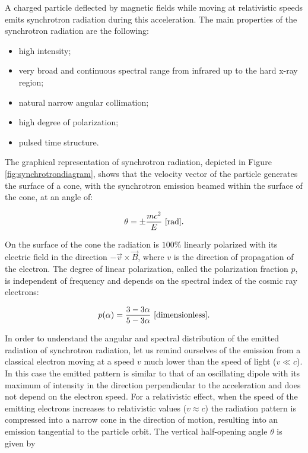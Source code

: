 \documentclass[a4paper,10pt]{article}
\begin{document}
{\noindent}A charged particle deflected by magnetic fields while moving at relativistic speeds emits synchrotron radiation during this acceleration. The main properties of the synchrotron radiation are the following:

\begin{itemize}
    \item high intensity;
    \item very broad and continuous spectral range from infrared up to the hard x-ray region;
    \item natural narrow angular collimation;
    \item high degree of polarization;
    \item pulsed time structure.
\end{itemize}

The graphical representation of synchrotron radiation, depicted in Figure \ref{fig:synchrotrondiagram}, shows that the velocity vector of the particle generates the surface of a cone, with the synchrotron emission beamed within the surface of the cone, at an angle of:

\begin{align*}
    \theta = \pm \frac{mc^2}{E} ~ [{\rm rad}].
\end{align*}

{\noindent}On the surface of the cone the radiation is $100\%$ linearly polarized with its electric field in the direction $-\vec{v}\times\vec{B}$, where $v$ is the direction of propagation of the electron. The degree of linear polarization, called the polarization fraction $p$, is independent of frequency and depends on the spectral index of the cosmic ray electrons:

\begin{align*}
    p(\alpha) = \frac{3-3\alpha}{5-3\alpha} ~ [{\rm dimensionless}].
\end{align*}

{\noindent}In order to understand the angular and spectral distribution of the emitted radiation of synchrotron radiation, let us remind ourselves of the emission from a classical electron moving at a speed $v$ much lower than the speed of light ($v\ll c$). In this case the emitted pattern is similar to that of an oscillating dipole with its maximum of intensity in the direction perpendicular to the acceleration and does not depend on the electron speed. For a relativistic effect, when the speed of the emitting electrons increases to relativistic values ($v\approx c$) the radiation pattern is compressed into a narrow cone in the direction of motion, resulting into an emission tangential to the particle orbit. The vertical half-opening angle $\theta$ is given by
\end{document}
